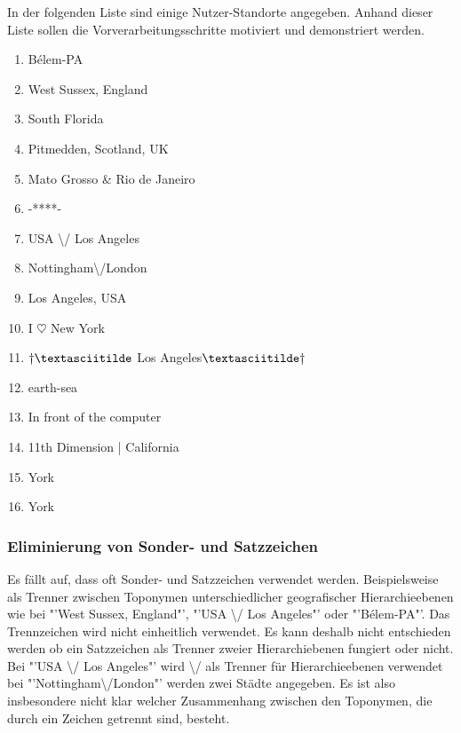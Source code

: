 			In der folgenden Liste sind einige Nutzer-Standorte angegeben. 
			Anhand dieser Liste sollen die Vorverarbeitungsschritte motiviert und demonstriert werden.

			\begin{multicols}{2}
			\begin{enumerate}
				\item Bélem-PA
				\item West Sussex, England
				\item South Florida
				\item Pitmedden,  Scotland, UK
				\item Mato Grosso \& Rio de Janeiro
				\item -****-
				\item USA \textbackslash/ Los Angeles
				\item Nottingham\textbackslash/London
				\item Los Angeles, USA
				\item I $\heartsuit$ New York 
				\item $\dagger\textasciitilde$ Los Angeles$\textasciitilde\dagger$
				\item earth-sea
				\item In front of the computer
				\item 11th Dimension | California
				\item York
				\item York
			\end{enumerate}
			\end{multicols}
				
			\subsubsection{Eliminierung von Sonder- und Satzzeichen} 

				Es fällt auf, dass oft Sonder- und Satzzeichen verwendet werden. 
				Beispielsweise als Trenner zwischen Toponymen unterschiedlicher geografischer Hierarchieebenen wie bei "'West Sussex, England"', "'USA \textbackslash/ Los Angeles"' oder "'Bélem-PA"'.
				Das Trennzeichen wird nicht einheitlich verwendet.  
				Es kann deshalb nicht entschieden werden ob ein Satzzeichen als Trenner zweier Hierarchiebenen fungiert oder nicht.
				Bei "'USA \textbackslash/ Los Angeles"' wird \textbackslash/ als Trenner für Hierarchieebenen verwendet bei "'Nottingham\textbackslash/London"' werden zwei Städte angegeben.
				Es ist also insbesondere nicht klar welcher Zusammenhang zwischen den Toponymen, die durch ein Zeichen getrennt sind, besteht. 

